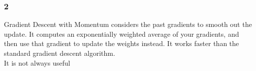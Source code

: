 \documentclass{article}
\begin{document}
\subsubsection*{2}
Gradient Descent with Momentum considers the past gradients to smooth out the update. It computes an exponentially weighted average of your gradients, and then use that gradient to update the weights instead. It works faster than the standard gradient descent algorithm.\\
It is not always useful \\
\end{document}
